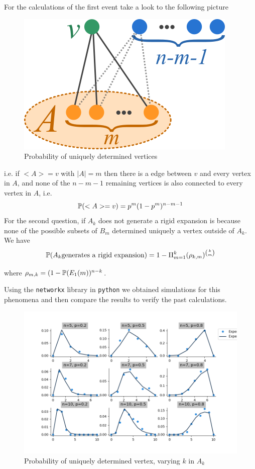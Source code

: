 For the calculations of the first event take a look to the following picture

\begin{figure}[h!]
	\centering
	\includegraphics[scale=0.8]{Figures/uni.png}
	\caption{Probability of uniquely determined vertices}
\end{figure}

i.e. if $<A> = v$ with $|A| = m$ then there is a edge between $v$ and every vertex in $A$, and none of the $n-m-1$ remaining vertices is also connected to every vertex in $A$, i.e.
$$\P(<A> = v) = p^{m}(1-p^{m})^{n-m-1}$$
For the second question, if $A_k$ does not generate a rigid expansion is because none of the possible subsets of $B_m$ determined uniquely a vertex outside of $A_k$. We have
$$\P(A_k \text{generates a rigid expansion}) = 1 -  \Pi_{m=1}^{k} (\rho_{k,m})^{\binom{k}{m}}  $$

where $\rho_{m,k} = (1 -  \P(E_1(m) )^{n-k}$.

Using the \texttt{networkx} library in \texttt{python} we obtained simulations for this phenomena and then compare the results to verify the past calculations.

\begin{figure}[h!]
	\centering
	\includegraphics[scale=0.5]{Python/Figures/Uniquely-determinated-fixed-vertex.png}
	\caption{Probability of uniquely determined vertex, varying $k$ in $A_k$}
\end{figure}

